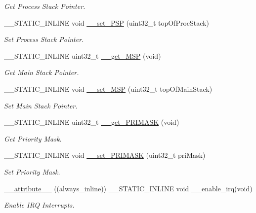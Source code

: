 \begin{DoxyCompactItemize}
\begin{DoxyCompactList}\small\item\em Get Process Stack Pointer. \end{DoxyCompactList}\item 
\+\_\+\+\_\+\+S\+T\+A\+T\+I\+C\+\_\+\+I\+N\+L\+I\+NE void \hyperlink{group___c_m_s_i_s___core___reg_acc_functions_gab145e35dbaf6868d3a17a8ad360fe379}{\+\_\+\+\_\+set\+\_\+\+P\+SP} (uint32\+\_\+t top\+Of\+Proc\+Stack)
\begin{DoxyCompactList}\small\item\em Set Process Stack Pointer. \end{DoxyCompactList}\item 
\+\_\+\+\_\+\+S\+T\+A\+T\+I\+C\+\_\+\+I\+N\+L\+I\+NE uint32\+\_\+t \hyperlink{group___c_m_s_i_s___core___reg_acc_functions_gac5267c10c9b15b5349eea0a959ea014c}{\+\_\+\+\_\+get\+\_\+\+M\+SP} (void)
\begin{DoxyCompactList}\small\item\em Get Main Stack Pointer. \end{DoxyCompactList}\item 
\+\_\+\+\_\+\+S\+T\+A\+T\+I\+C\+\_\+\+I\+N\+L\+I\+NE void \hyperlink{group___c_m_s_i_s___core___reg_acc_functions_ga1ff33c0b5ed0e687dd7967a1dd283d5f}{\+\_\+\+\_\+set\+\_\+\+M\+SP} (uint32\+\_\+t top\+Of\+Main\+Stack)
\begin{DoxyCompactList}\small\item\em Set Main Stack Pointer. \end{DoxyCompactList}\item 
\+\_\+\+\_\+\+S\+T\+A\+T\+I\+C\+\_\+\+I\+N\+L\+I\+NE uint32\+\_\+t \hyperlink{group___c_m_s_i_s___core___reg_acc_functions_gac9e3a67ff722261b89c77ebe49b6f9a7}{\+\_\+\+\_\+get\+\_\+\+P\+R\+I\+M\+A\+SK} (void)
\begin{DoxyCompactList}\small\item\em Get Priority Mask. \end{DoxyCompactList}\item 
\+\_\+\+\_\+\+S\+T\+A\+T\+I\+C\+\_\+\+I\+N\+L\+I\+NE void \hyperlink{group___c_m_s_i_s___core___reg_acc_functions_ga42e74e3fffe1a2d93db1de04d9260929}{\+\_\+\+\_\+set\+\_\+\+P\+R\+I\+M\+A\+SK} (uint32\+\_\+t pri\+Mask)
\begin{DoxyCompactList}\small\item\em Set Priority Mask. \end{DoxyCompactList}\item 
\hyperlink{group___c_m_s_i_s___core___reg_acc_functions_ga671b4fa3b3ab3dbc685a5473f3fc76aa}{\+\_\+\+\_\+attribute\+\_\+\+\_\+} ((always\+\_\+inline)) \+\_\+\+\_\+\+S\+T\+A\+T\+I\+C\+\_\+\+I\+N\+L\+I\+NE void \+\_\+\+\_\+enable\+\_\+irq(void)
\begin{DoxyCompactList}\small\item\em Enable I\+RQ Interrupts. \end{DoxyCompactList}\end{DoxyCompactItemize}


